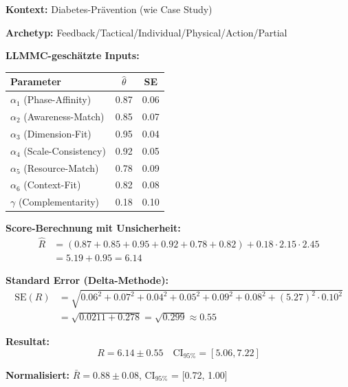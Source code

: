 \begin{tcolorbox}[colback=yellow!5!white, colframe=yellow!75!black,
    title=\textbf{Beispiel: Score mit Konfidenzintervall}]

\textbf{Kontext:} Diabetes-Prävention (wie Case Study)

\textbf{Archetyp:} Feedback/Tactical/Individual/Physical/Action/Partial

\textbf{LLMMC-geschätzte Inputs:}
\begin{center}
\begin{tabular}{@{}lcc@{}}
\toprule
\textbf{Parameter} & $\hat{\theta}$ & SE \\
\midrule
$\alpha_1$ (Phase-Affinity) & 0.87 & 0.06 \\
$\alpha_2$ (Awareness-Match) & 0.85 & 0.07 \\
$\alpha_3$ (Dimension-Fit) & 0.95 & 0.04 \\
$\alpha_4$ (Scale-Consistency) & 0.92 & 0.05 \\
$\alpha_5$ (Resource-Match) & 0.78 & 0.09 \\
$\alpha_6$ (Context-Fit) & 0.82 & 0.08 \\
$\gamma$ (Complementarity) & 0.18 & 0.10 \\
\bottomrule
\end{tabular}
\end{center}

\textbf{Score-Berechnung mit Unsicherheit:}
\begin{align*}
\hat{R} &= (0.87 + 0.85 + 0.95 + 0.92 + 0.78 + 0.82) + 0.18 \cdot 2.15 \cdot 2.45 \\
&= 5.19 + 0.95 = \mathbf{6.14}
\end{align*}

\textbf{Standard Error (Delta-Methode):}
\begin{align*}
\text{SE}(R) &= \sqrt{0.06^2 + 0.07^2 + 0.04^2 + 0.05^2 + 0.09^2 + 0.08^2 + (5.27)^2 \cdot 0.10^2} \\
&= \sqrt{0.0211 + 0.278} = \sqrt{0.299} \approx \mathbf{0.55}
\end{align*}

\textbf{Resultat:}
\begin{equation*}
\boxed{R = 6.14 \pm 0.55 \quad \text{CI}_{95\%} = [5.06, 7.22]}
\end{equation*}

\textbf{Normalisiert:} $\bar{R} = 0.88 \pm 0.08$, CI$_{95\%}$ = [0.72, 1.00]

\end{tcolorbox}

